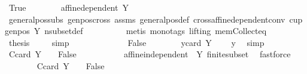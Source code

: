 \begin{isabellebody}
\ True\isanewline
\ \ \ \ \ \ \isamarkupfalse%
\ {\isachardoublequoteopen}{\isasymnot}affine{\isacharunderscore}{\kern0pt}dependent\ Y{\isachardoublequoteclose}\ \isamarkupfalse%
\ general{\isacharunderscore}{\kern0pt}pos{\isacharunderscore}{\kern0pt}subs\ genpos{\isacharunderscore}{\kern0pt}cross{}\ assms\ general{\isacharunderscore}{\kern0pt}pos{\isacharunderscore}{\kern0pt}def\ cross{\isacharunderscore}{\kern0pt}affine{\isacharunderscore}{\kern0pt}dependent{\isacharunderscore}{\kern0pt}conv\ cup{\isacharunderscore}{\kern0pt}genpos\ Y{\isacharparenleft}{\kern0pt}{}{\isacharparenright}{\kern0pt}\ nsubset{\isacharunderscore}{\kern0pt}def\isanewline
\ \ \ \ \ \ \ \ \isamarkupfalse%
\ {\isacharparenleft}{\kern0pt}metis\ {\isacharparenleft}{\kern0pt}mono{\isacharunderscore}{\kern0pt}tags{\isacharcomma}{\kern0pt}\ lifting{\isacharparenright}{\kern0pt}\ mem{\isacharunderscore}{\kern0pt}Collect{\isacharunderscore}{\kern0pt}eq{\isacharparenright}{\kern0pt}\isanewline
\ \ \ \ \ \ \isamarkupfalse%
\ {\isacharquery}{\kern0pt}thesis\ \isamarkupfalse%
\ {}\ \isamarkupfalse%
\ simp\ \isanewline
\ \ \ \ \isamarkupfalse%
\isanewline
\ \ \ \ \ \ \isamarkupfalse%
\ False\isanewline
\ \ \ \ \ \ \isamarkupfalse%
\ y{\isacharunderscore}{\kern0pt}{}{\isacharcolon}{\kern0pt}{\isachardoublequoteopen}card\ Y\ {\isasymle}\ {}{\isachardoublequoteclose}\ \isamarkupfalse%
\ y{\isacharunderscore}{\kern0pt}{}\ \isamarkupfalse%
\ simp\isanewline
\ \ \ \ \ \ \isamarkupfalse%
\ C{}{\isacharcolon}{\kern0pt}{\isachardoublequoteopen}card\ Y\ {\isacharequal}{\kern0pt}\ {}\ {\isasymLongrightarrow}\ False{\isachardoublequoteclose}\ \isanewline
\ \ \ \ \ \ \ \ \isamarkupfalse%
\ affine{\isacharunderscore}{\kern0pt}independent{\isacharunderscore}{\kern0pt}{}\ {\isachardoublequoteopen}{}{\isachardoublequoteclose}\ Y{\isacharparenleft}{\kern0pt}{}{\isacharparenright}{\kern0pt}\ finite{\isacharunderscore}{\kern0pt}subset\ \isamarkupfalse%
\ fastforce\isanewline
\ \ \ \ \ \ \isamarkupfalse%
\ C{}{\isacharcolon}{\kern0pt}{\isachardoublequoteopen}card\ Y\ {\isacharequal}{\kern0pt}\ {}\ {\isasymLongrightarrow}\ False{\isachardoublequoteclose}\ \isanewline

\end{isabellebody}
